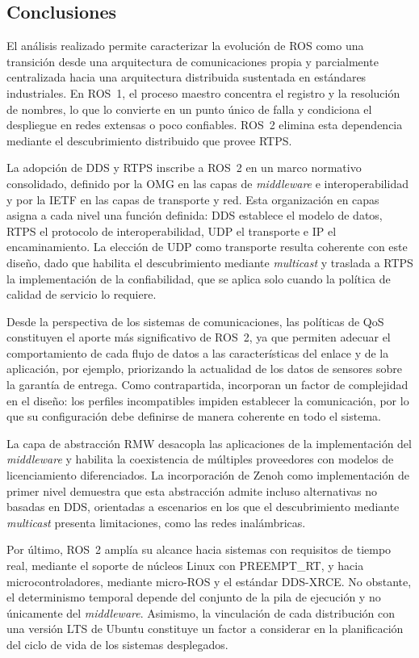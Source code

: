 
\subsection{Conclusiones}

El análisis realizado permite caracterizar la evolución de ROS como una
transición desde una arquitectura de comunicaciones propia y parcialmente
centralizada hacia una arquitectura distribuida sustentada en estándares
industriales. En ROS~1, el proceso maestro concentra el registro y la
resolución de nombres, lo que lo convierte en un punto único de falla y
condiciona el despliegue en redes extensas o poco confiables. ROS~2 elimina
esta dependencia mediante el descubrimiento distribuido que provee RTPS.

La adopción de DDS y RTPS inscribe a ROS~2 en un marco normativo consolidado,
definido por la OMG en las capas de \textit{middleware} e interoperabilidad y
por la IETF en las capas de transporte y red. Esta organización en capas
asigna a cada nivel una función definida: DDS establece el modelo de datos,
RTPS el protocolo de interoperabilidad, UDP el transporte e IP el
encaminamiento. La elección de UDP como transporte resulta coherente con este
diseño, dado que habilita el descubrimiento mediante \textit{multicast} y
traslada a RTPS la implementación de la confiabilidad, que se aplica solo
cuando la política de calidad de servicio lo requiere.

Desde la perspectiva de los sistemas de comunicaciones, las políticas de QoS
constituyen el aporte más significativo de ROS~2, ya que permiten adecuar el
comportamiento de cada flujo de datos a las características del enlace y de la
aplicación, por ejemplo, priorizando la actualidad de los datos de sensores
sobre la garantía de entrega. Como contrapartida, incorporan un factor de
complejidad en el diseño: los perfiles incompatibles impiden establecer la
comunicación, por lo que su configuración debe definirse de manera coherente
en todo el sistema.

La capa de abstracción RMW desacopla las aplicaciones de la implementación del
\textit{middleware} y habilita la coexistencia de múltiples proveedores con
modelos de licenciamiento diferenciados. La incorporación de Zenoh como
implementación de primer nivel demuestra que esta abstracción admite incluso
alternativas no basadas en DDS, orientadas a escenarios en los que el
descubrimiento mediante \textit{multicast} presenta limitaciones, como las
redes inalámbricas.

Por último, ROS~2 amplía su alcance hacia sistemas con requisitos de tiempo
real, mediante el soporte de núcleos Linux con PREEMPT\_RT, y hacia
microcontroladores, mediante micro-ROS y el estándar DDS-XRCE. No obstante, el
determinismo temporal depende del conjunto de la pila de ejecución y no
únicamente del \textit{middleware}. Asimismo, la vinculación de cada
distribución con una versión LTS de Ubuntu constituye un factor a considerar
en la planificación del ciclo de vida de los sistemas desplegados.